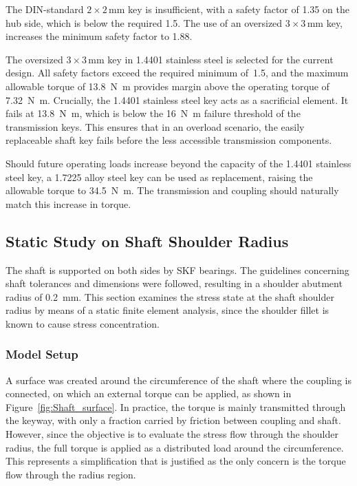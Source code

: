 \documentclass[11pt,a4paper,twoside,openright]{book}
\begin{document}
The DIN-standard $2 \times 2$\,\si{\milli\metre} key is insufficient, with a safety factor of 1.35 on the hub side, which is below the required 1.5. The use of an oversized $3 \times 3$\,\si{\milli\metre} key, increases the minimum safety factor to 1.88.
 
The oversized $3 \times 3$\,\si{\milli\metre} key in 1.4401 stainless steel is selected for the current design. All safety factors exceed the required minimum of~1.5, and the maximum allowable torque of \SI{13.8}{\newton\metre} provides margin above the operating torque of \SI{7.32}{\newton\metre}. Crucially, the 1.4401 stainless steel key acts as a sacrificial element. It fails at \SI{13.8}{\newton\metre}, which is below the \SI{16}{\newton\metre} failure threshold of the transmission keys. This ensures that in an overload scenario, the easily replaceable shaft key fails before the less accessible transmission components.
 
Should future operating loads increase beyond the capacity of the 1.4401 stainless steel key, a 1.7225 alloy steel key can be used as replacement, raising the allowable torque to \SI{34.5}{\newton\metre}. The transmission and coupling should naturally match this increase in torque.


\subsection{Static Study on Shaft Shoulder Radius}
\label{subsec:shaft_static_study}
 
The shaft is supported on both sides by SKF bearings. The guidelines concerning shaft tolerances and dimensions were followed, resulting in a shoulder abutment radius of \SI{0.2}{\milli\metre}. 
This section examines the stress state at the shaft shoulder radius by means of a static finite element analysis, since the shoulder fillet is known to cause stress concentration.
 
\subsubsection{Model Setup}
 
A surface was created around the circumference of the shaft where the coupling is connected, on which an external torque can be applied, as shown in Figure~\ref{fig:Shaft_surface}. In practice, the torque is mainly transmitted through the keyway, with only a fraction carried by friction between coupling and shaft. However, since the objective is to evaluate the stress flow through the shoulder radius, the full torque is applied as a distributed load around the circumference. This represents a simplification that is justified as the only concern is the torque flow through the radius region.
 
\end{document}

